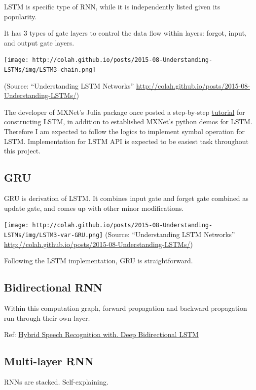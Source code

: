 \documentclass[]{article}
\begin{document}
LSTM is specific type of RNN, while it is independently listed given its
popularity.

It has 3 types of gate layers to control the data flow within layers:
forgot, input, and output gate layers.

\texttt{[image: http://colah.github.io/posts/2015-08-Understanding-LSTMs/img/LSTM3-chain.png]}

(Source: ``Understanding LSTM Networks''
\url{http://colah.github.io/posts/2015-08-Understanding-LSTMs/})

The developer of MXNet's Julia package once posted a step-by-step
\href{http://mxnetjl.readthedocs.org/en/latest/tutorial/char-lstm.html}{tutorial}
for constructing LSTM, in addition to established MXNet's python demos
for LSTM. Therefore I am expected to follow the logics to implement
symbol operation for LSTM. Implementation for LSTM API is expected to be
easiest task throughout this project.

\subsection{GRU}\label{gru}

GRU is derivation of LSTM. It combines input gate and forget gate
combined as update gate, and comes up with other minor modifications.

\texttt{[image: http://colah.github.io/posts/2015-08-Understanding-LSTMs/img/LSTM3-var-GRU.png]}
(Source: ``Understanding LSTM Networks''
\url{http://colah.github.io/posts/2015-08-Understanding-LSTMs/})

Following the LSTM implementation, GRU is straightforward.

\subsection{Bidirectional RNN}\label{bidirectional-rnn}

Within this computation graph, forward propagation and backward
propagation run through their own layer.

Ref: \href{http://www.cs.toronto.edu/~graves/asru_2013.pdf}{Hybrid
Speech Recognition with. Deep Bidirectional LSTM}

\subsection{Multi-layer RNN}\label{multi-layer-rnn}

RNNs are stacked. Self-explaining.
\end{document}
